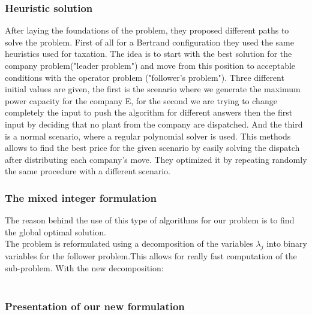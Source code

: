 \documentclass[letterpaper]{article}
\begin{document}
\subsubsection{Heuristic solution}
After laying the foundations of the problem, they proposed different paths to solve the problem. First of all for a Bertrand configuration they used the same heuristics used for taxation. The idea is to start with the best solution for the company problem("leader problem") and move from this position to acceptable conditions with the operator problem ("follower's problem"). Three different initial values are given, the first is the scenario where we generate the maximum power capacity for the company E, for the second we are trying to change completely the input to push the algorithm for different answers then the first input by deciding that no plant from the company are dispatched. And the third is a normal scenario, where a regular polynomial solver is used. This methods allows to find the best price for the given scenario by easily solving the dispatch after distributing each company's move. They optimized it by repeating randomly the same procedure with a different scenario.


\subsubsection{The mixed integer formulation}
The reason behind the use of this type of algorithms for our problem is to find the global optimal solution.\\ The problem is reformulated using a decomposition of the variables $\lambda_j$ into binary variables for the follower problem.This allows for really fast computation of the sub-problem. With the new decomposition: \\ \\


\subsubsection{Presentation of our new formulation}
\end{document}
